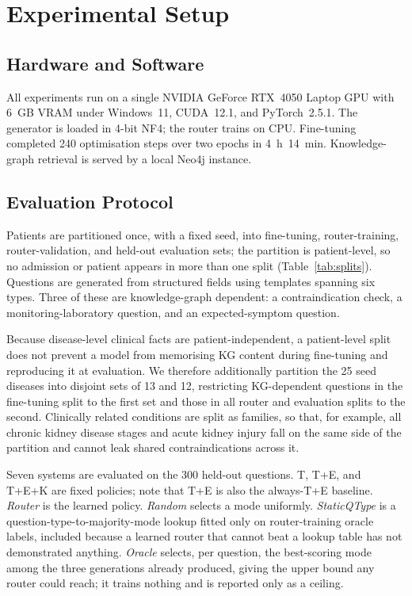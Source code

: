 \documentclass[conference]{IEEEtran}
\begin{document}
\section{Experimental Setup}

\subsection{Hardware and Software}

All experiments run on a single NVIDIA GeForce RTX~4050 Laptop GPU
with 6~GB VRAM under Windows~11, CUDA~12.1, and PyTorch~2.5.1. The
generator is loaded in 4-bit NF4; the router trains on CPU. Fine-tuning
completed 240 optimisation steps over two epochs in 4~h~14~min.
Knowledge-graph retrieval is served by a local Neo4j instance.

\subsection{Evaluation Protocol}

Patients are partitioned once, with a fixed seed, into fine-tuning,
router-training, router-validation, and held-out evaluation sets; the
partition is patient-level, so no admission or patient appears in more
than one split (Table~\ref{tab:splits}). Questions are generated from
structured fields using templates spanning six types. Three of these
are knowledge-graph dependent: a contraindication check, a
monitoring-laboratory question, and an expected-symptom question.

Because disease-level clinical facts are patient-independent, a
patient-level split does not prevent a model from memorising KG
content during fine-tuning and reproducing it at evaluation. We
therefore additionally partition the 25 seed diseases into disjoint
sets of 13 and 12, restricting KG-dependent questions in the
fine-tuning split to the first set and those in all router and
evaluation splits to the second. Clinically related conditions are
split as families, so that, for example, all chronic kidney disease
stages and acute kidney injury fall on the same side of the partition
and cannot leak shared contraindications across it.

Seven systems are evaluated on the 300 held-out questions. T, T+E, and
T+E+K are fixed policies; note that T+E is also the always-T+E
baseline. \textit{Router} is the learned policy. \textit{Random}
selects a mode uniformly. \textit{StaticQType} is a
question-type-to-majority-mode lookup fitted only on router-training
oracle labels, included because a learned router that cannot beat a
lookup table has not demonstrated anything. \textit{Oracle} selects,
per question, the best-scoring mode among the three generations
already produced, giving the upper bound any router could reach; it
trains nothing and is reported only as a ceiling.
\end{document}
